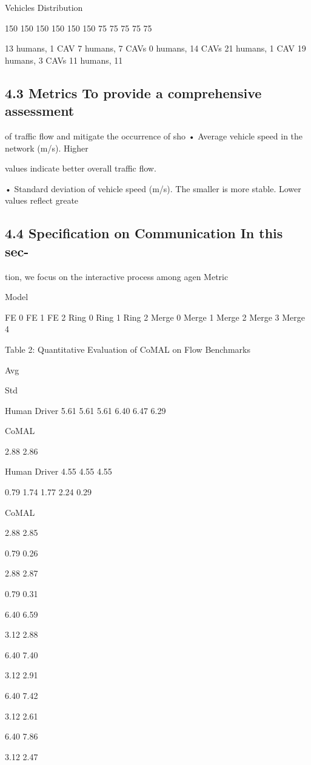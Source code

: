 \documentclass[12pt]{article}
\begin{document}
Vehicles Distribution


150
150
150
150
150
150
75
75
75
75
75


13 humans, 1 CAV
7 humans, 7 CAVs
0 humans, 14 CAVs
21 humans, 1 CAV
19 humans, 3 CAVs
11 humans, 11


\subsection{4.3 Metrics To provide a comprehensive assessment}

of traffic flow and mitigate the occurrence of sho
• Average vehicle speed in the network (m/s). Higher


values indicate better overall traffic flow.


• Standard deviation of vehicle speed (m/s). The
smaller is more stable. Lower values reflect greate


\subsection{4.4 Specification on Communication In this sec-}

tion, we focus on the interactive process among agen
Metric


Model


FE 0 FE 1 FE 2 Ring 0 Ring 1 Ring 2 Merge 0 Merge 1 Merge 2 Merge 3 Merge 4


Table 2: Quantitative Evaluation of CoMAL on Flow Benchmarks


Avg


Std


Human Driver 5.61 5.61 5.61
6.40 6.47 6.29


CoMAL


2.88
2.86


Human Driver 4.55 4.55 4.55


0.79
1.74 1.77 2.24 0.29


CoMAL


2.88
2.85


0.79
0.26


2.88
2.87


0.79
0.31


6.40
6.59


3.12
2.88


6.40
7.40


3.12
2.91


6.40
7.42


3.12
2.61


6.40
7.86


3.12
2.47
\end{document}
